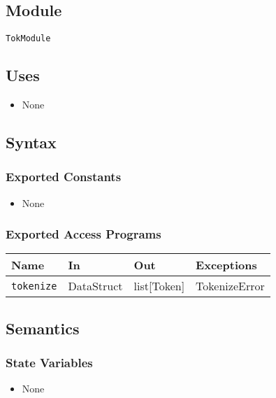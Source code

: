 \documentclass[12pt, titlepage]{article}
\begin{document}
\subsection{Module}

\texttt{TokModule}

\subsection{Uses}

\begin{itemize}
    \item None
\end{itemize}

\subsection{Syntax}

\subsubsection{Exported Constants}

\begin{itemize}
    \item None
\end{itemize}

\subsubsection{Exported Access Programs}

\begin{center}
\begin{tabular}{p{5cm} p{3.5cm} p{3.5cm} p{2cm}}
\hline
\textbf{Name} & \textbf{In} & \textbf{Out} & \textbf{Exceptions} \\
\hline
\texttt{tokenize} & DataStruct & list[Token] & TokenizeError \\
\hline
\end{tabular}
\end{center}

\subsection{Semantics}

\subsubsection{State Variables}

\begin{itemize}
    \item None
\end{itemize}
\end{document}

